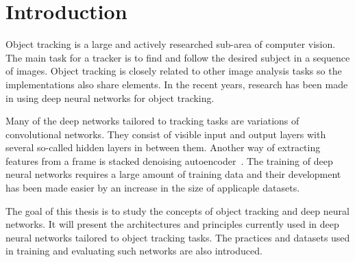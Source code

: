 \section{Introduction}

Object tracking is a large and actively researched sub-area of computer vision. The
main task for a tracker is to find and follow the desired subject in a sequence of
images. Object tracking is closely related to other image analysis tasks so the
implementations also share elements. In the recent years, research has been made in
using deep neural networks for object tracking.

Many of the deep networks tailored to tracking tasks are variations of convolutional
networks. They consist of visible input and
output layers with several so-called hidden layers in between them. Another way of
extracting features from a frame is stacked denoising autoencoder~\cite{LEARNING_DEEP}.
The training of deep neural networks requires a large amount of training data and their
development has been made easier by an increase in the size of applicaple datasets.

The goal of this thesis is to study the concepts of object tracking and deep neural
networks. It will present the architectures and principles currently used in deep
neural networks tailored to object tracking tasks. The practices and datasets used
in training and evaluating such networks are also introduced.
